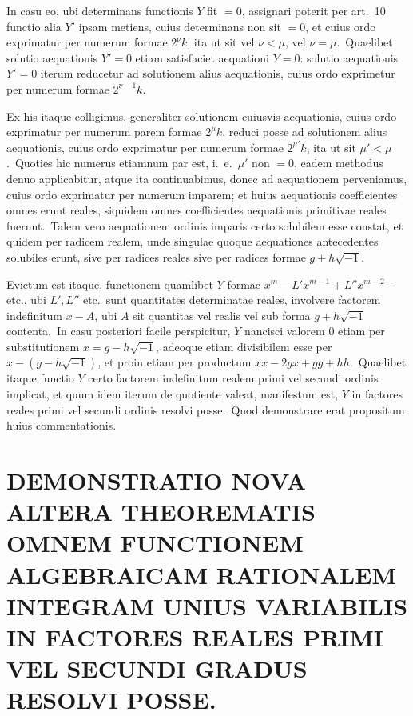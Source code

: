 \documentclass[12pt,a4paper]{article}
\theoremstyle{plain}
\begin{document}
In casu eo, ubi determinans functionis $Y$ fit $= 0$, assignari poterit per
art.\ 10 functio alia $Y'$ ipsam metiens, cuius determinans non sit $= 0$, et cuius
ordo exprimatur per numerum formae $2^\nu k$, ita ut sit vel $\nu < \mu$, vel $\nu = \mu$.\ Quaelibet solutio aequationis $Y' = 0$ etiam satisfaciet aequationi $Y = 0$: solutio aequationis $Y' = 0$ iterum reducetur ad solutionem alius aequationis, cuius ordo
exprimetur per numerum formae $2^{\nu-1}k$.

Ex his itaque colligimus, generaliter solutionem cuiusvis aequationis, cuius
ordo exprimatur per numerum parem formae $2^\mu k$, reduci posse ad solutionem
alius aequationis, cuius ordo exprimatur per numerum formae $2^{\mu'}k$, ita ut sit
$\mu' < \mu$.\ Quoties hic numerus etiamnum par est, i.\ e.\ $\mu'$ non $= 0$, eadem methodus denuo applicabitur, atque ita continuabimus, donec ad aequationem perveniamus, cuius ordo exprimatur per numerum imparem; et huius aequationis
coefficientes omnes erunt reales, siquidem omnes coefficientes aequationis primitivae reales fuerunt.\ Talem vero aequationem ordinis imparis certo solubilem esse
constat, et quidem per radicem realem, unde singulae quoque aequationes antecedentes solubiles erunt, sive per radices reales sive per radices formae $g + h\sqrt{-1}$.

Evictum est itaque, functionem quamlibet $Y$ formae $x^m - L'x^{m-1} + L''x^{m-2} -$
etc., ubi $L', L''$ etc.\ sunt quantitates determinatae reales, involvere factorem indefinitum $x - A$, ubi $A$ sit quantitas vel realis vel sub forma $g + h\sqrt{-1}$ contenta.\ In casu posteriori facile perspicitur, $Y$ nancisci valorem $0$ etiam per substitutionem $x = g - h\sqrt{-1}$, adeoque etiam divisibilem esse per $x - (g - h\sqrt{-1})$,
et proin etiam per productum $xx - 2gx + gg + hh$.\ Quaelibet itaque functio
$Y$ certo factorem indefinitum realem primi vel secundi ordinis implicat, et quum
idem iterum de quotiente valeat, manifestum est, $Y$ in factores reales primi vel
secundi ordinis resolvi posse.\ Quod demonstrare erat propositum huius commentationis.

\newpage
{}

\section*{DEMONSTRATIO NOVA ALTERA THEOREMATIS OMNEM FUNCTIONEM ALGEBRAICAM RATIONALEM INTEGRAM UNIUS VARIABILIS IN FACTORES REALES PRIMI VEL SECUNDI GRADUS RESOLVI POSSE.}
\end{document}
